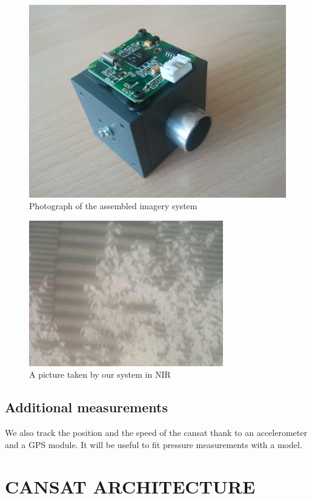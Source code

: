 \documentclass[twocolumn,10pt]{article}
\begin{document}
        \begin{figure}[!h]
        \includegraphics[scale=.5]{cube.png}
        \caption{Photograph of the assembled imagery system}
        \label{img_cube}
        \end{figure}
        
        \begin{figure}[!h]
        \includegraphics[scale=.7]{rehu.jpg}
        \caption{\small A picture taken by our system in NIR}
        \label{rehu}
        \end{figure}
    \subsection{Additional measurements}%
    \par We also track the position and the speed of the cansat thank to an accelerometer and a GPS module. It will be useful to fit pressure measurements with a model. 
\section{CANSAT ARCHITECTURE}%
\end{document}

